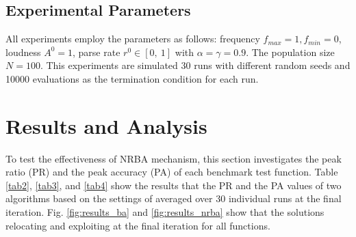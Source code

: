 \documentclass[conference]{IEEEtran}
\begin{document}
 \subsection{Experimental Parameters}
All experiments employ the parameters as follows: frequency ${f_{max}=1, f_{min}=0}$, loudness ${A^0}=1$, parse rate ${r^0} \in [0, \ 1]$ with ${\alpha =\gamma = 0.9}$. The population size ${N=100}$. This experiments are simulated 30 runs with different random seeds and 10000 evaluations as the termination condition for each run.


\section{Results and Analysis}
To test the effectiveness of NRBA mechanism, this section investigates the peak ratio (PR) and the peak accuracy (PA) of each benchmark test function. Table \ref{tab2}, \ref{tab3}, and \ref{tab4} show the results that the PR and the PA values of two algorithms based on the settings of averaged over 30 individual runs at the final iteration. Fig. \ref{fig:results_ba} and \ref{fig:results_nrba} show that the solutions relocating and exploiting at the final iteration for all functions.
\end{document}
